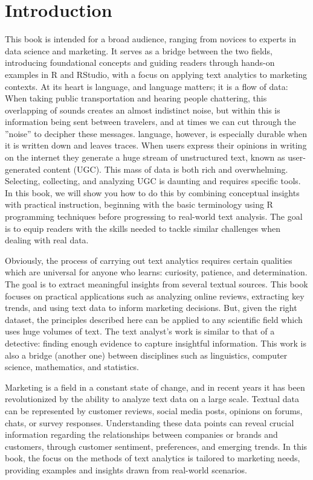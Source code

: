 
\chapter{Introduction}\label{sec-introduction}

This book is intended for a broad audience, ranging from novices to experts in data science and marketing. It serves as a bridge between the two fields, introducing foundational concepts and guiding readers through hands-on examples in R and RStudio, with a focus on applying text analytics to marketing contexts. At its heart is language, and language matters; it is a flow of data: When taking public transportation and hearing people chattering, this overlapping of sounds creates an almost indistinct noise, but within this is information being sent between travelers, and at times we can cut through the ''noise'' to decipher these messages. language, however, is especially durable when it is written down and leaves traces. When users express their opinions in writing on the internet they generate a huge stream of unstructured text, known as user-generated content (UGC). This mass of data is both rich and overwhelming. Selecting, collecting, and analyzing UGC is daunting and requires specific tools. In this book, we will show you how to do this by combining conceptual insights with practical instruction, beginning with the basic terminology using R programming techniques before progressing to real-world text analysis. The goal is to equip readers with the skills needed to tackle similar challenges when dealing with real data.

Obviously, the process of carrying out text analytics requires certain qualities which are universal for anyone who learns: curiosity, patience, and determination. The goal is to extract meaningful insights from several textual sources. This book focuses on practical applications such as analyzing online reviews, extracting key trends, and using text data to inform marketing decisions. But, given the right dataset, the principles described here can be applied to any scientific field which uses huge volumes of text. The text analyst's work is similar to that of a detective: finding enough evidence to capture insightful information. This work is also a bridge (another one) between disciplines such as linguistics, computer science, mathematics, and statistics.

Marketing is a field in a constant state of change, and in recent years it has been revolutionized by the ability to analyze text data on a large scale. Textual data can be represented by customer reviews, social media posts, opinions on forums, chats, or survey responses. Understanding these data points can reveal crucial information regarding the relationships between companies or brands and customers, through customer sentiment, preferences, and emerging trends. In this book, the focus on the methods of text analytics is tailored to marketing needs, providing examples and insights drawn from real-world scenarios.

